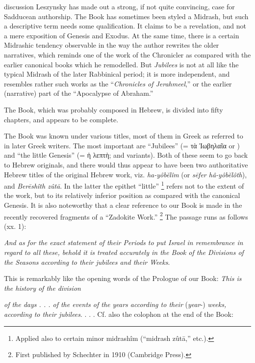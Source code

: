 discussion Leszynsky has made out a strong, if not quite convincing, case for Sadducean authorship. The Book has sometimes been styled a Midrash, but such a descriptive term needs some qualification. It claims to be a revelation, and not a mere exposition of Genesis and Exodus. At the same time, there is a certain Midrashic tendency observable in the way the author rewrites the older narratives, which reminds one of the work of the Chronicler as compared with the earlier canonical books which he remodelled. But \emph{Jubilees} is not at all like the typical Midrash of the later Rabbinical period; it is more independent, and resembles rather such works as the ``\emph{Chronicles of Jerahmeel},'' or the earlier (narrative) part of the ``Apocalypse of Abraham.''

The Book, which was probably composed in Hebrew, is divided into fifty chapters, and appears to be complete.


The Book was known under various titles, most of them in Greek as referred to in later Greek writers. The most important are ``Jubilees'' (= \textgreek{τὰ Ἰωβηλαῖα} or ) and ``the little Genesis'' (= \textgreek{ἡ λεπτὴ}; and variants). Both of these seem to go back to Hebrew originals, and there would thus appear to have been two authoritative Hebrew titles of the original Hebrew work, viz. \emph{ha-yôbĕlîm} (or \emph{sēfer hâ-yôbĕlôth}), and \emph{Berēshîth zûtā}. In the latter the epithet ``little'' \footnote{Applied also to certain minor midrashîm (``midrash zûtā,'' etc.).} refers not to the extent of the work, but to its relatively inferior position as compared with the canonical Genesis. It is also noteworthy that a clear reference to our Book is made in the recently recovered fragments of a ``Zadokite Work.'' \footnote{First published by Schechter in 1910 (Cambridge Press).} The passage runs as follows (xx. 1):

\emph{And as for the exact statement of their Periods to put Israel in remembrance in regard to all these, behold it is treated accurately in the Book of the Divisions of the Seasons according to their jubilees and their Weeks}.

This is remarkably like the opening words of the Prologue of our Book: \emph{This is the history of the division}

\emph{of the days . . . of the events of the years according to their} (\emph{year}-) \emph{weeks, according to their jubilees}. . . . Cf. also the colophon at the end of the Book:

